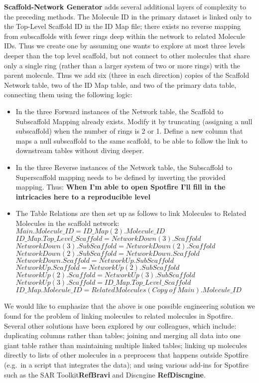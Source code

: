\documentclass[journal=jacsat,manuscript=article]{achemso}
\newcommand*\eg{e.g.~}
\begin{document}
{\bf Scaffold-Network Generator} adds several additional layers of complexity to the preceding methods. The Molecule ID in the primary dataset is linked only to the Top-Level Scaffold ID in the ID Map file; there exists no reverse mapping from subscaffolds with fewer rings deep within the network to related Molecule IDs. Thus we create one by assuming one wants to explore at most three levels deeper than the top level scaffold, but not connect to other molecules that share only a single ring (rather than a larger system of two or more rings) with the parent molecule. Thus we add six (three in each direction) copies of the Scaffold Network table, two of the ID Map table, and two of the primary data table, connecting them using the following logic:
\begin{itemize}
\item In the three Forward instances of the Network table, the Scaffold to Subscaffold Mapping already exists. Modify it by truncating (assigning a null subscaffold) when the number of rings is 2 or 1. 
\subitem Define a new column that maps a null subscaffold to the same scaffold, to be able to follow the link to downstream tables without diving deeper.
\item In the three Reverse instances of the Network table, the Subscaffold to Superscaffold mapping needs to be defined by inverting the provided mapping. Thus:
\subitem \textbf{When I'm able to open Spotfire I'll fill in the intricacies here to a reproducible level}
\item The Table Relations are then set up as follows to link Molecules to Related Molecules in the scaffold network:    
\subitem $Main.Molecule\_ID = ID\_Map(2).Molecule\_ID$
\subitem $ID\_Map.Top\_Level\_Scaffold = NetworkDown(3).Scaffold$
\subitem $NetworkDown(3).SubScaffold = NetworkDown(2).Scaffold$
\subitem $NetworkDown(2).SubScaffold = NetworkDown.Scaffold$
\subitem $NetworkDown.Scaffold = NetworkUp.SubScaffold$
\subitem $NetworkUp.Scaffold = NetworkUp(2).SubScaffold$
\subitem $NetworkUp(2).Scaffold = NetworkUp(3).SubScaffold$
\subitem $NetworkUp(3).Scaffold = ID\_Map.Top\_Level\_Scaffold$
\subitem $ID\_Map.Molecule\_ID = Related Molecules(Copy~of~Main).Molecule\_ID$ 
\end{itemize}   

We would like to emphasize that the above is one possible engineering solution we found for the problem of linking molecules to related molecules in Spotfire.  Several other solutions have been explored by our colleagues, which include: duplicating columns rather than tables; joining and merging all data into one giant table rather than maintaining multiple linked tables; linking up molecules directly to lists of other molecules in a preprocess that happens outside Spotfire (\eg in a script that integrates the data); and using various add-ins for Spotfire such as the SAR Toolkit{\bf RefBravi} and Discngine {\bf RefDiscngine}.
 
\end{document}
